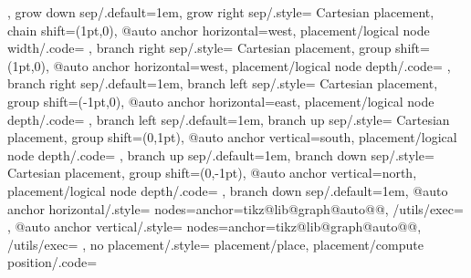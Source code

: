 {{{  },
  grow down sep/.default=1em,
  grow right sep/.style={
    Cartesian placement,
    chain shift={(1pt,0)},
    @auto anchor horizontal=west,
    placement/logical node width/.code=
  },
  branch right sep/.style={
    Cartesian placement,
    group shift={(1pt,0)},
    @auto anchor horizontal=west,
    placement/logical node depth/.code=
  },
  branch right sep/.default=1em,
  branch left sep/.style={
    Cartesian placement,
    group shift={(-1pt,0)},
    @auto anchor horizontal=east,
    placement/logical node depth/.code=
  },
  branch left sep/.default=1em,
  branch up sep/.style={
    Cartesian placement,
    group shift={(0,1pt)},
    @auto anchor vertical=south,
    placement/logical node depth/.code=
  },
  branch up sep/.default=1em,
  branch down sep/.style={
    Cartesian placement,
    group shift={(0,-1pt)},
    @auto anchor vertical=north,
    placement/logical node depth/.code=
  },
  branch down sep/.default=1em,
  @auto anchor horizontal/.style={
    nodes={anchor=\csname tikz@lib@graph@auto@\tikz@lib@graph@auto@h @\tikz@lib@graph@auto@v\endcsname},
    /utils/exec=\def\tikz@lib@graph@auto@h{#1}
  },
  @auto anchor vertical/.style={
    nodes={anchor=\csname tikz@lib@graph@auto@\tikz@lib@graph@auto@h @\tikz@lib@graph@auto@v\endcsname},
    /utils/exec=\def\tikz@lib@graph@auto@v{#1}
  },
  no placement/.style={
    placement/place,
    placement/compute position/.code=%
  }
}%

\def\tikz@lib@graph@auto@h{center}%
\def\tikz@lib@graph@auto@v{center}%

\def\tikz@lib@graph@auto@center@center{center}%
\def\tikz@lib@graph@auto@west@center{west}%
\def\tikz@lib@graph@auto@east@center{east}%
\def\tikz@lib@graph@auto@center@north{north}%
\def\tikz@lib@graph@auto@west@north{north west}%
\def\tikz@lib@graph@auto@east@north{north east}%
\def\tikz@lib@graph@auto@center@south{south}%
\def\tikz@lib@graph@auto@west@south{south west}%
\def\tikz@lib@graph@auto@east@south{south east}%

\def\tikz@lib@graph@linear@pos{%
  \pgfkeysgetvalue{/tikz/graphs/chain shift}\tikz@temp
  \expandafter\tikz@scan@one@point\expandafter\pgf@process\tikz@temp
  \pgf@process{\pgfpointscale{\pgfkeysvalueof{/tikz/graphs/placement/width}}{}}%
  \pgf@xa=\pgf@x%
  \pgf@ya=\pgf@y%
  \pgfkeysgetvalue{/tikz/graphs/group shift}\tikz@temp
  \expandafter\tikz@scan@one@point\expandafter\pgf@process\tikz@temp
  \pgf@process{\pgfpointscale{\pgfkeysvalueof{/tikz/graphs/placement/depth}}{}}%
  \advance\pgf@xa by\pgf@x%
  \advance\pgf@ya by\pgf@y%
  \edef\tikz@lib@graph@shift{(\the\pgf@xa,\the\pgf@ya)}
  \pgfkeys{/tikz/graphs/nodes/.expanded={shift={\tikz@lib@graph@shift}}}
}%


}
